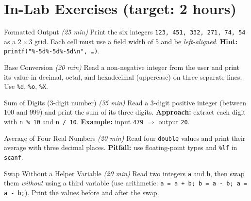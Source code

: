 \documentclass[11pt]{article}
\begin{document}
\section*{In-Lab Exercises (target: 2 hours)}

\begin{labexercise}{Formatted Output \hfill {\small \itshape (25 min)}}
Print the six integers \texttt{123, 451, 332, 271, 74, 54} as a $2\times 3$ grid.
Each cell must use a field width of 5 and be \emph{left-aligned}.
\textbf{Hint:} \texttt{printf("\%-5d\%-5d\%-5d\textbackslash n", \ldots)}.
\end{labexercise}

\begin{labexercise}{Base Conversion \hfill {\small \itshape (20 min)}}
Read a non-negative integer from the user and print its value in decimal, octal, and
hexadecimal (uppercase) on three separate lines.
Use \texttt{\%d}, \texttt{\%o}, \texttt{\%X}.
\end{labexercise}

\begin{labexercise}{Sum of Digits (3-digit number) \hfill {\small \itshape (35 min)}}
Read a 3-digit positive integer (between 100 and 999) and print the sum of its three digits.
\textbf{Approach:} extract each digit with \texttt{n \% 10} and \texttt{n / 10}.
\textbf{Example:} input \texttt{479} $\Rightarrow$ output \texttt{20}.
\end{labexercise}

\begin{labexercise}{Average of Four Real Numbers \hfill {\small \itshape (20 min)}}
Read four \texttt{double} values and print their average with three decimal places.
\textbf{Pitfall:} use floating-point types and \texttt{\%lf} in \texttt{scanf}.
\end{labexercise}

\begin{labexercise}{Swap Without a Helper Variable \hfill {\small \itshape (20 min)}}
Read two integers \texttt{a} and \texttt{b}, then swap them \emph{without} using a third variable
(use arithmetic: \texttt{a = a + b; b = a - b; a = a - b;}).
Print the values before and after the swap.
\end{labexercise}
\end{document}
